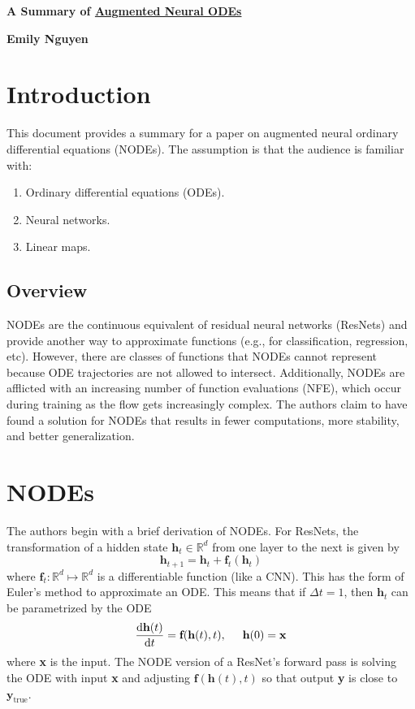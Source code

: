 \documentclass[letterpaper,12 pt]{article}
\begin{document}
\begin{center}
\Large \textbf{A Summary of \href{https://arxiv.org/pdf/1904.01681.pdf}{Augmented Neural ODEs}}

\vspace{2mm}

\large \textbf{Emily Nguyen}
\end{center}

\section{Introduction}
This document provides a summary for a paper on augmented neural ordinary differential equations (NODEs). The assumption is that the audience is familiar with:
\begin{enumerate}
    \item Ordinary differential equations (ODEs).
    \item Neural networks. 
    \item Linear maps.
\end{enumerate}

\subsection{Overview}
NODEs are the continuous equivalent of residual neural networks (ResNets) and provide another way to approximate functions (e.g., for classification, regression, etc). However, there are classes of functions that NODEs cannot represent because ODE trajectories are not allowed to intersect. 
Additionally, NODEs are afflicted with an increasing number of function evaluations (NFE), which occur during training as the flow gets increasingly complex. The authors claim to have found a solution for NODEs that results in fewer computations, more stability, and better generalization.

\section{NODEs}
The authors begin with a brief derivation of NODEs. For ResNets, the transformation of a hidden state $\textbf{h}_t\in \mathbb{R}^d$ from one layer to the next is given by 
\[\textbf{h}_{t+1}=\textbf{h}_t+\textbf{f}_t(\textbf{h}_t)\]
\noindent where $\textbf{f}_t:\mathbb{R}^d\mapsto \mathbb{R}^d$ is a differentiable function (like a CNN). This has the form of Euler's method to approximate an ODE. This means that if $\Delta t=1$, then $\textbf{h}_t$ can be parametrized by the ODE
\[\frac{\text{d}\textbf{h}(t)}{\text{d}t}=\textbf{f}(\textbf{h}(t),t), \hspace{5mm} \textbf{h}(0)=\textbf{x}\]
\noindent where \textbf{x} is the input. The NODE version of a ResNet's forward pass is solving the ODE with input \textbf{x} and adjusting $\textbf{f}(\textbf{h}(t),t)$ so that output \textbf{y} is close to $\textbf{y}_{\text{true}}$.
\end{document}
